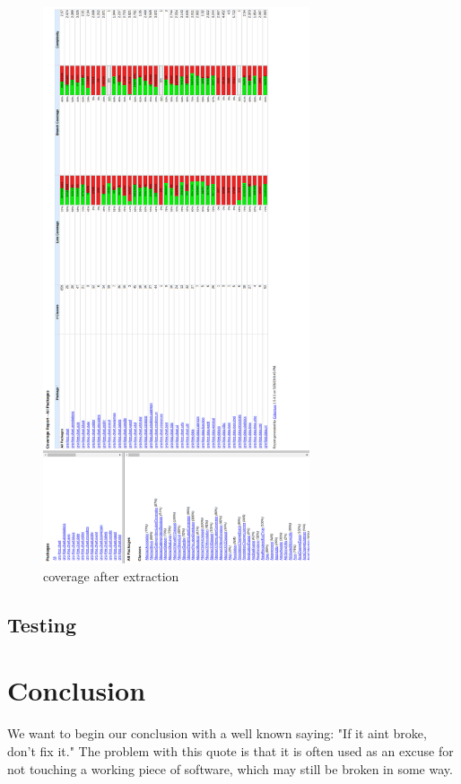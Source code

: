 \documentclass{article}
\begin{document}
\newpage
\begin{figure}[H]
\centering
	\includegraphics[width=0.7\textwidth]{coverage/AFTER.png}
	\caption{coverage after extraction}
\end{figure}

\subsection{Testing}


\newpage
\section{Conclusion}

We want to begin our conclusion with a well known saying: "If it aint broke, don't fix it." The problem with this quote is that it is often used as an excuse for not touching a working piece of software, which may still be broken in some way.\cite{mps}\\ 
\end{document}
